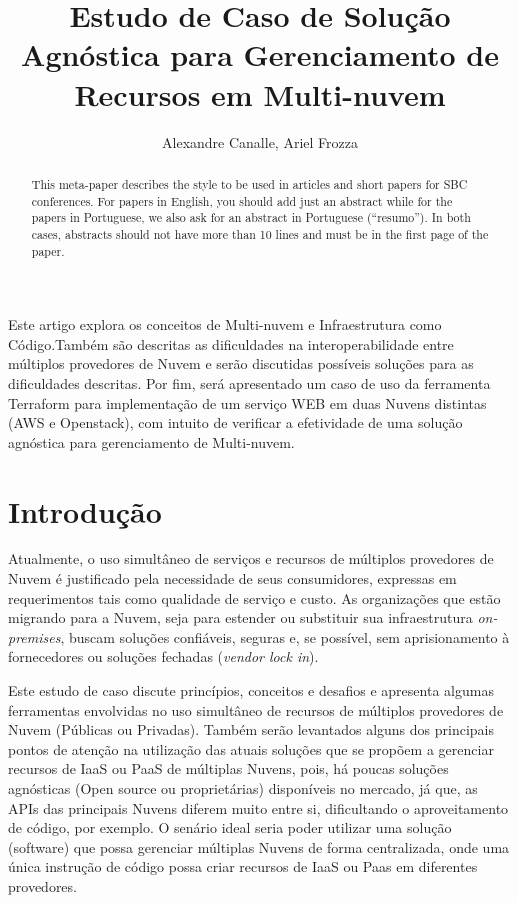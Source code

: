 \documentclass[12pt]{article}
\title{Estudo de Caso de Solução Agnóstica para Gerenciamento de Recursos em Multi-nuvem}
\author{Alexandre Canalle\inst{1}, Ariel Frozza\inst{1}}
\begin{document}
\sloppy
\maketitle
	
\begin{abstract}
	This meta-paper describes the style to be used in articles and short papers
	for SBC conferences. For papers in English, you should add just an abstract
	while for the papers in Portuguese, we also ask for an abstract in
	Portuguese (``resumo''). In both cases, abstracts should not have more than
	10 lines and must be in the first page of the paper.
\end{abstract}

\begin{resumo} 
	Este artigo explora os conceitos de Multi-nuvem e Infraestrutura como Código.Também são descritas as dificuldades na interoperabilidade entre múltiplos provedores de Nuvem e serão discutidas possíveis soluções para as dificuldades descritas. Por fim, será apresentado um caso de uso da ferramenta Terraform para implementação de um serviço WEB em duas Nuvens distintas (AWS e Openstack), com intuito de verificar a efetividade de uma solução agnóstica para gerenciamento de Multi-nuvem.
\end{resumo}

	\section{Introdução}
	    Atualmente, o uso simultâneo de serviços e recursos de múltiplos provedores de Nuvem é justificado pela necessidade de seus consumidores, expressas em requerimentos tais como qualidade de serviço e custo. As organizações que estão migrando para a Nuvem, seja para estender ou substituir sua infraestrutura \textit{on-premises}, buscam soluções confiáveis, seguras e, se possível, sem aprisionamento à fornecedores ou soluções fechadas (\textit{vendor lock in}).
	    
	    Este estudo de caso discute princípios, conceitos e desafios e apresenta algumas ferramentas envolvidas no uso simultâneo de recursos de múltiplos provedores de Nuvem (Públicas ou Privadas). Também serão levantados alguns dos principais pontos de atenção na utilização das atuais soluções que se propõem a gerenciar recursos de IaaS ou PaaS de múltiplas Nuvens, pois, há poucas soluções agnósticas (Open source ou proprietárias) disponíveis no mercado, já que, as APIs das principais Nuvens diferem muito entre si, dificultando o aproveitamento de código, por exemplo. O senário ideal seria poder utilizar uma solução (software) que possa gerenciar múltiplas Nuvens de forma centralizada, onde uma única instrução de código possa criar recursos de IaaS ou Paas em diferentes provedores.
	    
\end{document}
